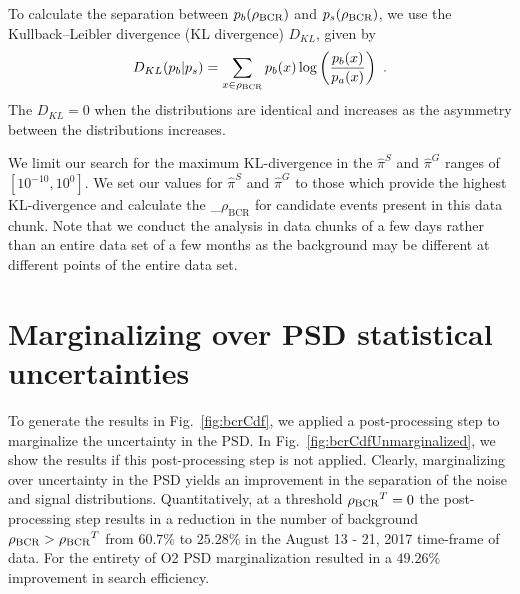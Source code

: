 \documentclass[%
 nofootinbib,
 amsmath,amssymb,
 aps,
 twocolumn,
 superscriptaddress
]{revtex4-2}
\newcommand{\mathcmd}[1]{{\sc \relax\ifmmode#1\else $#1$\fi}\xspace}
\newcommand{\bcr}{\mathcmd{\rho_\text{BCR}}}
\begin{document}
To calculate the separation between $p_b(\bcr)$ and $p_s(\bcr)$, we use the Kullback--Leibler divergence (KL divergence) $D_{KL}$, given by
\begin{equation}
    D_{KL}(p_b | p_s) = \sum\limits_{x\in \bcr} p_b(x) \log \left( \frac{p_b(x)}{p_a(x)} \right)  \ .
\end{equation}
The $D_{KL}=0$ when the distributions are identical and increases as the asymmetry between the distributions increases. 

We limit our search for the maximum KL-divergence in the $\hat{\pi}^S$ and $\hat{\pi}^G$ ranges of $[10^{-10}, 10^0]$. We set our values for $\hat{\pi}^S$ and $\hat{\pi}^G$ to those which provide the highest KL-divergence and calculate the \bcr for candidate events present in this data chunk. Note that we conduct the analysis in data chunks of a few days rather than an entire data set of a few months as the background may be different at different points of the entire data set.

\section{Marginalizing over PSD statistical uncertainties}\label{sec:psd-marginalization}
To generate the results in Fig.~\ref{fig:bcrCdf}, we applied a post-processing step to marginalize the uncertainty in the PSD. In Fig.~\ref{fig:bcrCdfUnmarginalized}, we show the results if this post-processing step is not applied. Clearly, marginalizing over uncertainty in the PSD yields an improvement in the separation of the noise and signal distributions. Quantitatively, at a threshold $\bcr^T=0$ the post-processing step results in a reduction in the number of background $\bcr > \bcr^T$ from $60.7\%$ to $25.28\%$ in the August 13 - 21, 2017 time-frame of data. For the entirety of O2 PSD marginalization resulted in a $49.26\%$ improvement in search efficiency. 
\end{document}
